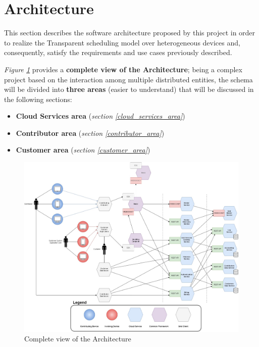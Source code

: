 \section{Architecture}
This section describes the software architecture proposed by this project in order to realize the Transparent scheduling model over heterogeneous devices and, consequently, satisfy the requirements and use cases previously described.

\textit{Figure \ref{fig:architecture_complete}} provides a \textbf{complete view of the Architecture}; being a complex project based on the interaction among multiple distributed entities, the schema will be divided into \textbf{three areas} (easier to understand) that will be discussed in the following sections:
\begin{itemize}
    \item \textbf{Cloud Services area} (\textit{section \ref{cloud_services_area}})
    \item \textbf{Contributor area} (\textit{section \ref{contributor_area}})
    \item \textbf{Customer area} (\textit{section \ref{customer_area}})
\end{itemize}
\begin{figure}[!ht]
    \centering
    \includegraphics[width=\linewidth]{document/chapters/chapter_6/images/architecture_complete.jpg}
    \caption{Complete view of the Architecture}
    \label{fig:architecture_complete}
\end{figure}

